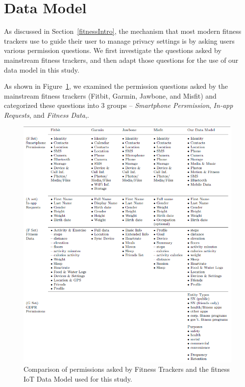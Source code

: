 
\section{Data Model}
As discussed in Section~\ref{fitnessIntro}, the mechanism that most modern fitness trackers use to guide their user to manage privacy settings is by asking users various permission questions. We first investigate the questions asked by mainstream fitness trackers, and then adapt those questions for the use of our data model in this study.

As shown in Figure~\ref{tab:trackerspermission}, we examined the permission questions asked by the mainstream fitness trackers (Fitbit, Garmin, Jawbone, and Misfit) and categorized these questions into 3 groups -- \textit{Smartphone Persmission}, \textit{In-app Requests}, and \textit{Fitness Data},.
 
\begin{figure}
	\centering
	\includegraphics[width=\textwidth]{figures/fitnessCompare.png}
	\caption{Comparison of permissions asked by Fitness Trackers and the fitness IoT Data Model used for this study.}
	\label{tab:trackerspermission}
\end{figure}

